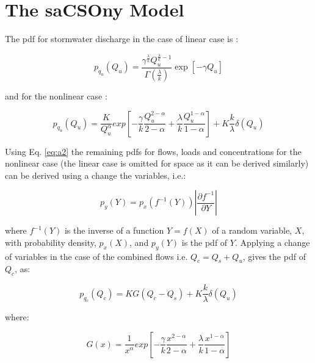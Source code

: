 \documentclass[draft,linenumbers]{agujournal2018}
\begin{document}
\section{The saCSOny Model}
The pdf for stormwater discharge in the case of linear case is \citep{Botter_2009}:
\begin{linenomath*}
\begin{equation} 
p_{q_u} \left(Q_u \right) = \frac{\gamma^{\frac{\lambda}{k}} Q_u^{\frac{\lambda}{k}-1}}{\Gamma\left(\frac{\lambda}{k}\right)}  \exp\left[-\gamma Q_u \right]
\label{eq:a1} 
\end{equation}
\end{linenomath*}
and for the nonlinear case \citep{Botter_2009}:
\begin{linenomath*}
\begin{equation}
p_{q_u}\left(Q_u \right) = \frac{K}{Q_u^{\alpha}} exp\left[-\frac{\gamma}{k}\frac{Q_u^{2-\alpha}}{2-\alpha} +\frac{\lambda}{k} \frac{Q_u^{1-\alpha}}{1-\alpha}   \right] + K \frac{k}{\lambda} \delta \left(Q_u\right)
\label{eq:a2}
\end{equation}
\end{linenomath*}
Using Eq. \ref{eq:a2} the remaining pdfs for f\/lows, loads and concentrations for the nonlinear case (the linear case is omitted for space as it can be derived similarly) can be derived using a change the variables, i.e.:
\begin{linenomath*}
\begin{equation}
p_y\left(Y\right) = p_x\left(f^{-1}\left(Y\right)\right) \left| \frac{\partial f^{-1}}{\partial Y} \right|	
\label{eq:a3}
\end{equation}
\end{linenomath*}
where $f^{-1}\left(Y\right)$ is the inverse of a function $Y=f\left(X\right)$ of a random variable, $X$, with probability density, $p_x \left(X\right)$, and $p_y\left(Y\right)$ is the pdf of $Y$. Applying a change of variables in the case of the combined f\/lows i.e. $Q_c = Q_s+Q_u$, gives the pdf of $Q_c$, as:
\begin{linenomath*}
\begin{equation}
p_{q_c}\left(Q_c \right) = K G\left(Q_c - Q_s \right) + K \frac{k}{\lambda} \delta \left(Q_u\right)
\label{eq:a4}
\end{equation}
\end{linenomath*}
where:
\begin{linenomath*}
\begin{equation}
G\left(x \right) = \frac{1}{x^{\alpha}} exp\left[-\frac{\gamma}{k}\frac{x^{2-\alpha}}{2-\alpha} +\frac{\lambda}{k} \frac{x^{1-\alpha}}{1-\alpha}   \right]
\label{eq:a5}
\end{equation}
\end{linenomath*}
\end{document}
